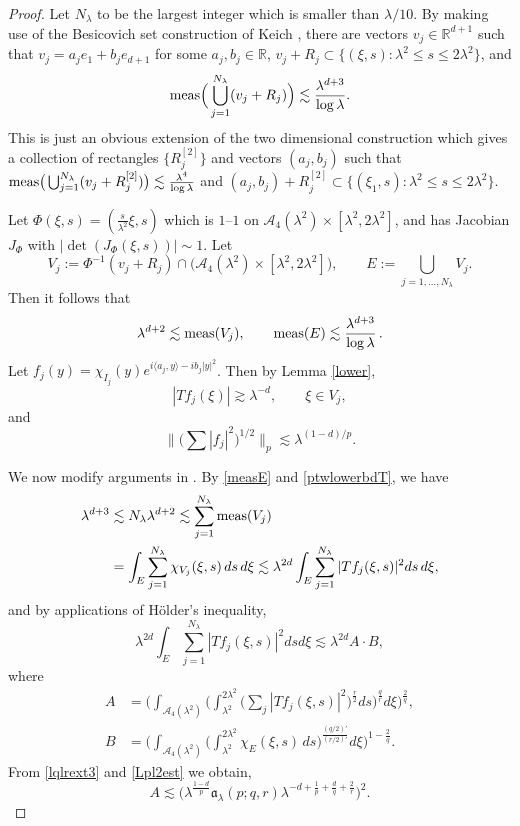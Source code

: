 \documentclass[11pt]{amsart}
\theoremstyle{definition}
\numberwithin{theorem}{section}
\numberwithin{definition}{section}
\numberwithin{equation}{section}
\def\inn#1#2{\langle#1,#2\rangle}
\newcommand{\Be}{\begin{equation}}
\newcommand{\Ee}{\end{equation}}
\renewcommand{\le}{\leqslant}
\def\inn#1#2{\langle#1,#2\rangle}
\def\meas{{\text{\rm meas}}}
\def\lc{\lesssim}
\def\gc{\gtrsim}
\def\la{\lambda}             \def\La{\Lambda}
\def\fa{{\mathfrak {a}}}
\def\bbR{{\mathbb {R}}}
\def\cA{{\mathcal {A}}}
\renewcommand{\le}{\leqslant}
\begin{document}
\begin{proof}
Let $N_\la $ to be the largest integer which is smaller than
$\la/10$. By making use of the Besicovich set construction of
Keich  \cite{keich},  there are vectors
$v_j\in \bbR^{d+1}$ such that $v_j=a_je_1+b_je_{d+1}$ for some $a_j,
b_j\in \bbR$,
$v_j+R_j\subset\{(\xi, s ): \lambda^2\le  s  \le 2\la^2\}$, and   %
$$
\meas\Big(\bigcup_{j=1}^{N_\la }(v_j+R_j)\Big) \lc
\frac{\la^{d+3}}{\log\la}.
$$
This  is just an obvious extension of
the two dimensional construction which gives a collection of rectangles
$\{R_j^{[2]}\}$ and vectors $(a_j,b_j) $ such that
$\meas\big(\bigcup_{j=1}^{N_\la }(v_j+ R_j^{[2]})\big) \lc
\frac{\la^{4}}{\log\la} $ and $(a_j,b_j)+ R_j^{[2]}\subset
\{(\xi_1, s ): \lambda^2\le  s  \le 2\la^2\}$.


 Let $\Phi(\xi, s )= (\tfrac{ s }{\la^2}
\xi, s )$ which is $1$--$1$ on $\cA_4(\la^2)\times [\la^2,  2\la^2]$,
and has Jacobian $J_\Phi$ with $|\det( J_\Phi(\xi, s ))|\sim 1$. Let $$
V_j:= \Phi^{-1}(v_j+R_j) \cap \big(\cA_4(\la^2)\times[\la^2, 2\la^2]\big),
\qquad E:= \bigcup_{j=1,\dots, N_\la } V_j.
$$
Then it follows that
\Be\label{measE}\la^{d+2} \lc \meas(V_j), \qquad
\meas(E)\lc\frac{\la^{d+3}}{\log\la}\,.
\Ee
Let $f_j(y) = \chi_{I_j}(y)e^{i\inn{a_j}{y}-ib_j|y|^2}$. Then by  Lemma \ref{lower},
\Be \label{ptwlowerbdT}
|T f_j(\xi)|\gc \la^{-d}, \qquad \xi\in V_j,
\Ee
and
\Be\label{Lpl2est}
\Big\|\Big(\sum|f_j|^2\Big)^{1/2}\Big\|_p\lc \la^{(1-d)/p}.
\Ee

We now modify arguments in  \cite{BCSS}.
By  \eqref{measE}  and \eqref{ptwlowerbdT},  we have
\begin{align}\label{summeasVjone}
\la^{d+3}&\lc N_\la \la^{d+2}\lc
\sum_{j=1}^{N_\la }\meas (V_j) \\ &=
\int_E \sum_{j=1}^{N_\la } \chi_{V_j}(\xi, s )\, d s \,d\xi \lc \la^{2d}\int_E \sum_{j=1}^{N_\la }
 |T f_j(\xi, s )|^2 d s \,d\xi,\nonumber
\end{align}
and by applications of H\"older's inequality,
\Be\label{summeasVjtwo}
\la^{2d}\int_E \sum_{j=1}^{N_\la }
 |T f_j(\xi, s )|^2 d s  d\xi\lesssim \la^{2d}  A\cdot B,
\Ee
where
\begin{align*}
A&=\Big(\int_{\cA_4(\la^2)}\Big(\int_{\la^2}^{2\la^2}\Big(\sum_j|Tf_j(\xi, s )|^2\Big)^{\frac r2} d s  \Big)^{\frac qr}d\xi\Big)^{\frac 2q},\\
B&=\Big(\int_{\cA_4(\la^2)}\Big(\int_{\la^2}^{2\la^2}  \chi_{E}(\xi, s ) \,d s
\Big)^{\frac{(q/2)'}{(r/2)'}} d\xi \Big)^{1-\frac 2q}.
\end{align*}
From \eqref{lqlrext3} and \eqref{Lpl2est}  we obtain,
\Be\label{aa}
A\lesssim \Big( \la^{\frac{1-d}{p}}\fa_\la (p;q,r) \la^{- d+\frac 1p +\frac dq+\frac 2r} \Big )^2.
\Ee


\end{proof}
\end{document}

